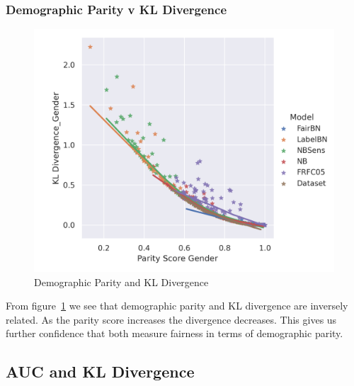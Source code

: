 \subsubsection{Demographic Parity v KL Divergence}

\begin{figure}
    \centering
    \includegraphics[width=\linewidth]{figures/kldvsdempar-synthethic.png}
    \caption{Demographic Parity and KL Divergence}
    \label{fig:kldvsdempar}
\end{figure}

From figure~\ref{fig:kldvsdempar} we see that demographic parity and KL divergence are inversely related. As the parity score increases the divergence decreases. This gives us further confidence that both measure fairness in terms of demographic parity.

\subsection{AUC and KL Divergence}

